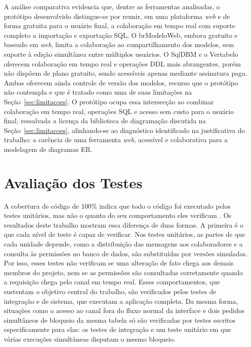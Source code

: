 A análise comparativa evidencia que, dentre as ferramentas analisadas, o protótipo desenvolvido distingue-se por reunir, em uma plataforma \textit{web} e de forma gratuita para o usuário final, a colaboração em tempo real com suporte completo a importação e exportação SQL. O brModeloWeb, embora gratuito e baseado em \textit{web}, limita a colaboração ao compartilhamento dos modelos, sem suporte à edição simultânea entre múltiplos usuários. O SqlDBM e o Vertabelo oferecem colaboração em tempo real e operações DDL mais abrangentes, porém não dispõem de plano gratuito, sendo acessíveis apenas mediante assinatura paga. Ambas oferecem ainda controle de versão dos modelos, recurso que o protótipo não contempla e que é tratado como uma de suas limitações na Seção~\ref{sec:limitacoes}. O protótipo ocupa essa intersecção ao combinar colaboração em tempo real, operações SQL e acesso sem custo para o usuário final, ressalvada a licença da biblioteca de diagramação discutida na Seção~\ref{sec:limitacoes}, alinhando-se ao diagnóstico identificado na justificativa do trabalho: a carência de uma ferramenta \textit{web}, acessível e colaborativa para a modelagem de diagramas ER.

\section{Avaliação dos Testes}

A cobertura de código de 100\% indica que todo o código foi executado pelos testes unitários, mas não o quanto do seu comportamento eles verificam \cite{Inozemtseva2014}. Os resultados deste trabalho mostram essa diferença de duas formas. A primeira é o que cada nível de teste é capaz de verificar. Nos testes unitários, as partes de que cada unidade depende, como a distribuição das mensagens aos colaboradores e a consulta às permissões no banco de dados, são substituídas por versões simuladas. Por isso, esses testes não verificam se uma alteração de fato chega aos demais membros do projeto, nem se as permissões são consultadas corretamente quando a requisição chega pelo canal em tempo real. Esses comportamentos, que sustentam o objetivo central do trabalho, são verificados pelos testes de integração e de sistema, que executam a aplicação completa. Da mesma forma, situações como o acesso ao canal fora do fluxo normal da interface e dois pedidos simultâneos de bloqueio da mesma tabela só são verificadas por testes escritos especificamente para elas: os testes de integração e um teste unitário em que várias execuções simultâneas disputam o mesmo bloqueio.

